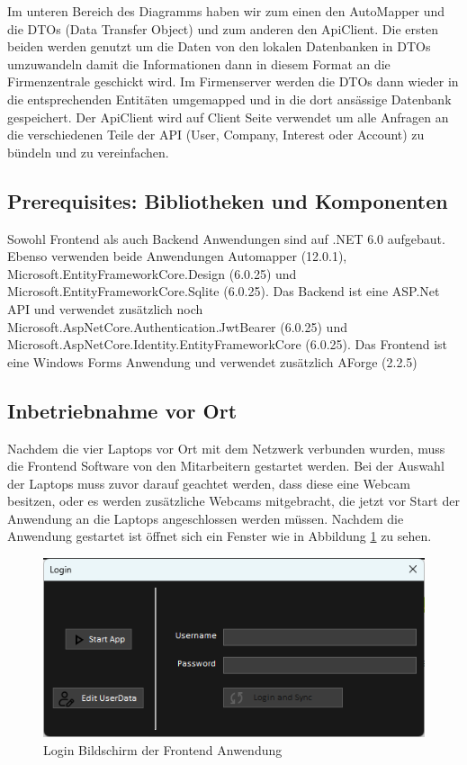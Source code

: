 Im unteren Bereich des Diagramms haben wir zum einen den AutoMapper und die DTOs (Data Transfer Object) und zum anderen den ApiClient. Die ersten beiden werden genutzt um die Daten von den lokalen Datenbanken in DTOs umzuwandeln damit die Informationen dann in diesem Format an die Firmenzentrale geschickt wird. Im Firmenserver werden die DTOs dann wieder in die entsprechenden Entitäten umgemapped und in die dort ansässige Datenbank gespeichert. Der ApiClient wird auf Client Seite verwendet um alle Anfragen an die verschiedenen Teile der API (User, Company, Interest oder Account) zu bündeln und zu vereinfachen.

\subsection{Prerequisites: Bibliotheken und Komponenten}
Sowohl Frontend als auch Backend Anwendungen sind auf .NET 6.0 aufgebaut. Ebenso verwenden beide Anwendungen Automapper (12.0.1), \\ Microsoft.EntityFrameworkCore.Design (6.0.25) und \\ Microsoft.EntityFrameworkCore.Sqlite (6.0.25). Das Backend ist eine ASP.Net API und verwendet zusätzlich noch Microsoft.AspNetCore.Authentication.JwtBearer (6.0.25) und Microsoft.AspNetCore.Identity.EntityFrameworkCore (6.0.25). Das Frontend ist eine Windows Forms Anwendung und verwendet zusätzlich AForge (2.2.5)

\newpage
\subsection{Inbetriebnahme vor Ort}
Nachdem die vier Laptops vor Ort mit dem Netzwerk verbunden wurden, muss die Frontend Software von den Mitarbeitern gestartet werden. Bei der Auswahl der Laptops muss zuvor darauf geachtet werden, dass diese eine Webcam besitzen, oder es werden zusätzliche Webcams mitgebracht, die jetzt vor Start der Anwendung an die Laptops angeschlossen werden müssen. Nachdem die Anwendung gestartet ist öffnet sich ein Fenster wie in Abbildung \ref{fig:projektmesseloginscreen} zu sehen.

\begin{figure}[h]
	\centering
	\includegraphics[width=0.7\linewidth]{Images/LoginScreen}
	\caption{Login Bildschirm der Frontend Anwendung}
	\label{fig:projektmesseloginscreen}
\end{figure}

